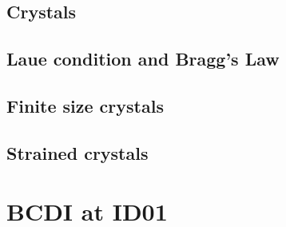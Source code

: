 \subsection{Crystals}
\subsection{Laue condition and Bragg's Law} 
\subsection{Finite size crystals}
\subsection{Strained crystals}

\section{BCDI at ID01}\label{chp:phasing}
